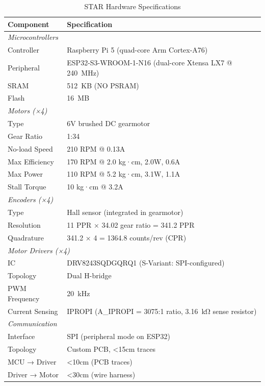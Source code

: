 \documentclass[12pt,letterpaper]{article}
\begin{document}
\begin{table}[H]
\centering
\caption{STAR Hardware Specifications}
\begin{tabular}{ll}
\toprule
\textbf{Component} & \textbf{Specification} \\
\midrule
\multicolumn{2}{l}{\textit{Microcontrollers}} \\
Controller & Raspberry Pi 5 (quad-core Arm Cortex-A76) \\
Peripheral & ESP32-S3-WROOM-1-N16 (dual-core Xtensa LX7 @ 240~MHz) \\
SRAM & 512~KB (NO PSRAM) \\
Flash & 16~MB \\
\midrule
\multicolumn{2}{l}{\textit{Motors (×4)}} \\
Type & 6V brushed DC gearmotor \\
Gear Ratio & 1:34 \\
No-load Speed & 210 RPM @ 0.13A \\
Max Efficiency & 170 RPM @ 2.0 kg·cm, 2.0W, 0.6A \\
Max Power & 110 RPM @ 5.2 kg·cm, 3.1W, 1.1A \\
Stall Torque & 10 kg·cm @ 3.2A \\
\midrule
\multicolumn{2}{l}{\textit{Encoders (×4)}} \\
Type & Hall sensor (integrated in gearmotor) \\
Resolution & 11 PPR × 34.02 gear ratio = 341.2 PPR \\
Quadrature & 341.2 × 4 = 1364.8 counts/rev (CPR) \\
\midrule
\multicolumn{2}{l}{\textit{Motor Drivers (×4)}} \\
IC & DRV8243SQDGQRQ1 (S-Variant: SPI-configured) \\
Topology & Dual H-bridge \\
PWM Frequency & 20~kHz \\
Current Sensing & IPROPI (A\_IPROPI = 3075:1 ratio, 3.16~kΩ sense resistor) \\
\midrule
\multicolumn{2}{l}{\textit{Communication}} \\
Interface & SPI (peripheral mode on ESP32) \\
Topology & Custom PCB, <15cm traces \\
MCU → Driver & <10cm (PCB traces) \\
Driver → Motor & <30cm (wire harness) \\
\bottomrule
\end{tabular}
\end{table}
\end{document}
